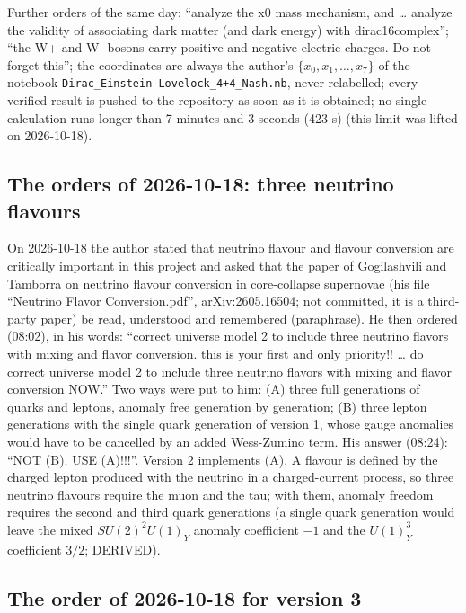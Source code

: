 \documentclass[
  10pt,
]{article}
\begin{document}
Further orders of the same day: ``analyze the x0 mass mechanism, and
\ldots{} analyze the validity of associating dark matter (and dark
energy) with dirac16complex''; ``the W+ and W- bosons carry positive and
negative electric charges. Do not forget this''; the coordinates are
always the author's \(\{x_0, x_1, \dots, x_7\}\) of the notebook
\texttt{Dirac\_Einstein-Lovelock\_4+4\_Nash.nb}, never relabelled; every
verified result is pushed to the repository as soon as it is obtained;
no single calculation runs longer than 7 minutes and 3 seconds (423 s)
(this limit was lifted on 2026-10-18).

\hypertarget{the-orders-of-2026-10-18-three-neutrino-flavours}{%
\subsection{The orders of 2026-10-18: three neutrino
flavours}\label{the-orders-of-2026-10-18-three-neutrino-flavours}}

On 2026-10-18 the author stated that neutrino flavour and flavour
conversion are critically important in this project and asked that the
paper of Gogilashvili and Tamborra on neutrino flavour conversion in
core-collapse supernovae (his file ``Neutrino Flavor Conversion.pdf'',
arXiv:2605.16504; not committed, it is a third-party paper) be read,
understood and remembered (paraphrase). He then ordered (08:02), in his
words: ``correct universe model 2 to include three neutrino flavors with
mixing and flavor conversion. this is your first and only priority!!
\ldots{} do correct universe model 2 to include three neutrino flavors
with mixing and flavor conversion NOW.'' Two ways were put to him: (A)
three full generations of quarks and leptons, anomaly free generation by
generation; (B) three lepton generations with the single quark
generation of version 1, whose gauge anomalies would have to be
cancelled by an added Wess-Zumino term. His answer (08:24): ``NOT (B).
USE (A)!!!''. Version 2 implements (A). A flavour is defined by the
charged lepton produced with the neutrino in a charged-current process,
so three neutrino flavours require the muon and the tau; with them,
anomaly freedom requires the second and third quark generations (a
single quark generation would leave the mixed \(SU(2)^2U(1)_Y\) anomaly
coefficient \(-1\) and the \(U(1)_Y^3\) coefficient \(3/2\); DERIVED).

\hypertarget{the-order-of-2026-10-18-for-version-3}{%
\subsection{The order of 2026-10-18 for version
3}\label{the-order-of-2026-10-18-for-version-3}}
\end{document}
